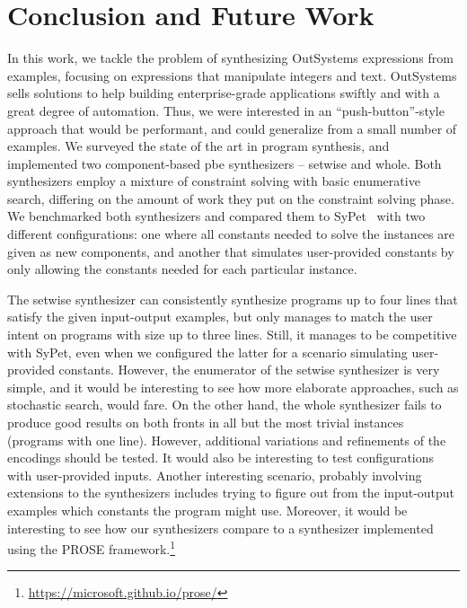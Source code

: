 \chapter{Conclusion and Future Work}
\label{chap:conclusion}

In this work, we tackle the problem of synthesizing OutSystems expressions from
examples, focusing on expressions that manipulate integers and text.
OutSystems sells solutions to help building enterprise-grade applications
swiftly and with a great degree of automation.
Thus, we were interested in an ``push-button''-style approach that would be
performant, and could generalize from a small number of examples.
We surveyed the state of the art in program synthesis, and implemented two
component-based \gls{pbe} synthesizers -- setwise and whole.
Both synthesizers employ a mixture of constraint solving with basic enumerative
search, differing on the amount of work they put on the constraint solving
phase.
We benchmarked both synthesizers and compared them to SyPet~\cite{Feng:2017:CSC}
with two different configurations: one where all constants needed to solve the
instances are given as new components, and another that simulates
user-provided constants by only allowing the constants needed for each
particular instance.

The setwise synthesizer can consistently synthesize programs up to four lines
that satisfy the given input-output examples, but only manages to match the user
intent on programs with size up to three lines.
Still, it manages to be competitive with SyPet, even when we configured the
latter for a scenario simulating user-provided constants.
However, the enumerator of the setwise synthesizer is very simple, and it would
be interesting to see how more elaborate approaches, such as stochastic search,
would fare.
On the other hand, the whole synthesizer fails to produce good results on both
fronts in all but the most trivial instances (programs with one line).
However, additional variations and refinements of the encodings should be
tested.
It would also be interesting to test configurations with user-provided inputs.
Another interesting scenario, probably involving extensions to the synthesizers
includes trying to figure out from the input-output examples which constants the
program might use.
Moreover, it would be interesting to see how our synthesizers compare to a
synthesizer implemented using the PROSE
framework.\footnote{\url{https://microsoft.github.io/prose/}}

